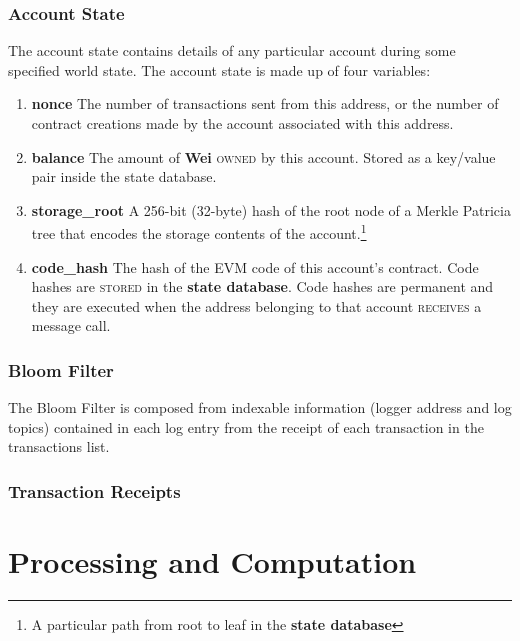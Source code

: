 \documentclass[10pt,letterpaper,leqno,bibliography=totoc]{scrartcl}
\newenvironment{alphafootnotes}
{\par\edef\savedfootnotenumber{\number\value{footnote}}
\renewcommand{\thefootnote}{\alph{footnote}}
\setcounter{footnote}{0}}
{\par\setcounter{footnote}{\savedfootnotenumber}}
\begin{document}
\begin{alphafootnotes}
\begin{multicols*}{2}
					\subsubsection{Account State}
				The account state contains details of any particular account during some specified world state. The account state is made up of four variables:
				\begin{enumerate}
					\item \textbf{nonce} The number of transactions sent from this address, or the number of contract creations made by the account associated with this address.
					\item \textbf{balance} The amount of \textbf{Wei} \textsc{owned} by this account. Stored as a key/value pair inside the state database. 
					\item \textbf{storage\_root} A 256-bit (32-byte) hash of the root node of a Merkle Patricia tree that encodes the storage contents of the account.\footnote{A particular path from root to leaf in the \textbf{\gls{state database}}} 
					\item \textbf{code\_hash} The hash of the EVM code of this account's contract. Code hashes are \textsc{stored} in the \textbf{\gls{state database}}. Code hashes are permanent and they are executed when the address belonging to that account \textsc{receives} a message call.

				\end{enumerate}

    					\subsubsection{Bloom Filter}
				The Bloom Filter is composed from indexable information (logger address and log topics) contained in each log entry from the receipt of each transaction in the transactions list. 

					\subsubsection{Transaction Receipts}


		\section{Processing and Computation}
	

\end{multicols*}
\end{alphafootnotes}
\end{document}
